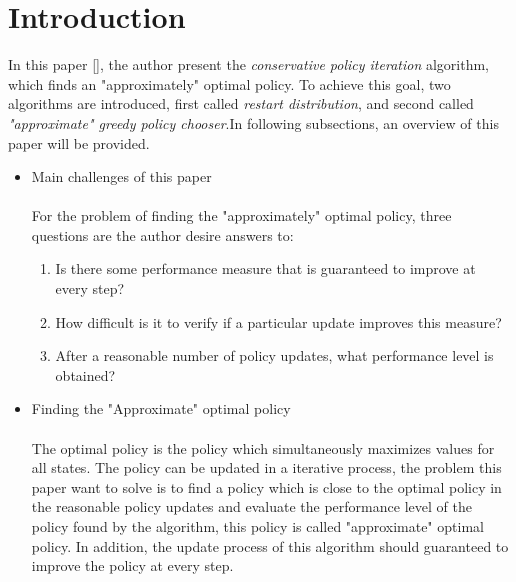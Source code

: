 \section{Introduction}
\label{section:intro}
In this paper [\cite{DBLP:Kakade02approximatelyoptimal}], the author present the \emph{conservative policy iteration} algorithm, which finds an "approximately" optimal policy. To achieve this goal, two algorithms are introduced, first called \emph{restart distribution}, and second called \emph{"approximate" greedy policy chooser}.In following subsections, an overview of this paper will be provided.
\begin{itemize}

    \item Main challenges of this paper
    \paragraph{}
    For the problem of finding the "approximately" optimal policy, three questions are the author desire answers to:
    \begin{enumerate}
    \item Is there some performance measure that is guaranteed to improve at every step?
    \item How difficult is it to verify if a particular update improves this measure?
    \item After a reasonable number of policy updates, what performance level is obtained?
    \\
    \end{enumerate}
   
    
    \item Finding the "Approximate" optimal policy
    \paragraph{}
    The optimal policy is the policy which simultaneously maximizes values for all states. The policy can be updated in a iterative process, the problem this paper want to solve is to find a policy which is close to the optimal policy in the reasonable policy updates and evaluate the performance level of the policy found by the algorithm, this policy is called "approximate" optimal policy. In addition, the update process of this algorithm should guaranteed to improve the policy at every step.
    \\
    

\end{itemize}
